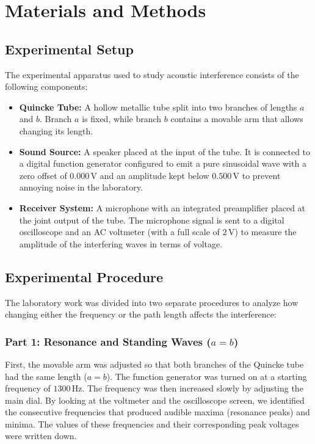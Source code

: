 \documentclass[a4paper,11pt]{article}
\begin{document}
\section{Materials and Methods}

\subsection{Experimental Setup}
The experimental apparatus used to study acoustic interference consists of the following components:
\begin{itemize}
    \item \textbf{Quincke Tube:} A hollow metallic tube split into two branches of lengths $a$ and $b$. Branch $a$ is fixed, while branch $b$ contains a movable arm that allows changing its length.
    \item \textbf{Sound Source:} A speaker placed at the input of the tube. It is connected to a digital function generator configured to emit a pure sinusoidal wave with a zero offset of \ensuremath{0.000\,\mathrm{V}} and an amplitude kept below \ensuremath{0.500\,\mathrm{V}} to prevent annoying noise in the laboratory.
    \item \textbf{Receiver System:} A microphone with an integrated preamplifier placed at the joint output of the tube. The microphone signal is sent to a digital oscilloscope and an AC voltmeter (with a full scale of \ensuremath{2\,\mathrm{V}}) to measure the amplitude of the interfering waves in terms of voltage.
\end{itemize}

\subsection{Experimental Procedure}
The laboratory work was divided into two separate procedures to analyze how changing either the frequency or the path length affects the interference:

\subsubsection{Part 1: Resonance and Standing Waves ($a = b$)}
First, the movable arm was adjusted so that both branches of the Quincke tube had the same length ($a = b$). The function generator was turned on at a starting frequency of \ensuremath{1300\,\mathrm{Hz}}. The frequency was then increased slowly by adjusting the main dial. By looking at the voltmeter and the oscilloscope screen, we identified the consecutive frequencies that produced audible maxima (resonance peaks) and minima. The values of these frequencies and their corresponding peak voltages were written down.
\end{document}
